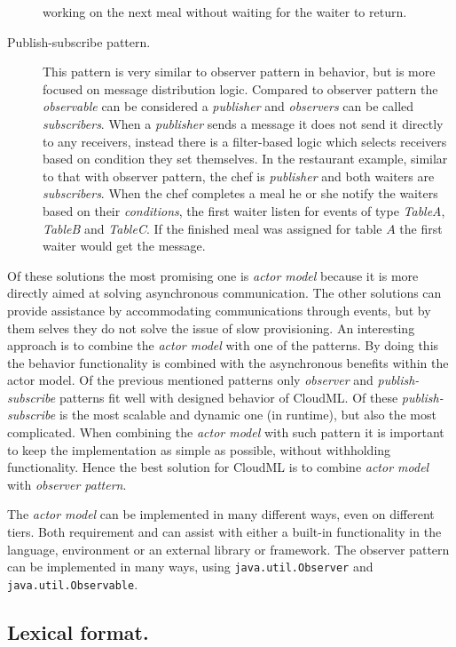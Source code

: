 \begin{description}
    working on the next meal without waiting for the waiter to return.
  \item[Publish-subscribe pattern.] This pattern is very similar to observer pattern in behavior,
    but is more focused on message distribution logic.
    Compared to observer pattern the \emph{observable} can be considered a \emph{publisher} and
    \emph{observers} can be called \emph{subscribers}.
    When a \emph{publisher} sends a message it does not send it directly to any receivers,
    instead there is a filter-based logic which selects receivers based on condition they set themselves.
    In the restaurant example, similar to that with observer pattern, the chef is \emph{publisher}
    and both waiters are \emph{subscribers}.
    When the chef completes a meal he or she notify the waiters based on their \emph{conditions},
    \eg the first waiter listen for events of type \emph{TableA}, \emph{TableB} and \emph{TableC}.
    If the finished meal was assigned for table $A$ the first waiter would get the message.
\end{description}
Of these solutions the most promising one is \emph{actor model} because it is more directly aimed
at solving asynchronous communication.
The other solutions can provide assistance by accommodating communications through events, 
but by them selves they do not solve the issue of slow provisioning.
An interesting approach is to combine the \emph{actor model} with one of the patterns.
By doing this the behavior functionality is combined with the asynchronous benefits within the actor model.
Of the previous mentioned patterns only \emph{observer} and \emph{publish-subscribe} patterns 
fit well with designed behavior of CloudML.
Of these \emph{publish-subscribe} is the most scalable and dynamic one (in runtime),
but also the most complicated.
When combining the \emph{actor model} with such pattern it is important to keep the implementation
as simple as possible, without withholding functionality.
Hence the best solution for CloudML is to combine \emph{actor model} with \emph{observer pattern}.

The \emph{actor model} can be implemented in many different ways, even on different tiers.
Both requirement  and  can assist with either
a built-in functionality in the language, environment or an external library or framework.
The observer pattern can be implemented in many ways,
\eg using \texttt{java.util.Observer} and \texttt{java.util.Observable}.

\subsection{Lexical format.}

